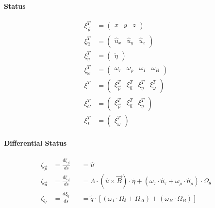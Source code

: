 \documentclass[review]{elsarticle}
\begin{document}
\paragraph{Status}
\begin{equation} \begin{alignedat}{-1}
    \xi_{\vec{p}}^{T}&=\left(\begin{array}{ccc}
        x & y & z
    \end{array}\right) \\
    \xi_{\hat{u}}^{T}&=\left(\begin{array}{ccc}
        {\hat{u}}_{x} & {\hat{u}}_{y} & {\hat{u}}_{z}
    \end{array}\right) \\
    \xi_{\tilde{\eta}}^{T}&=\left(\begin{array}{c}
        \tilde{\eta}
    \end{array}\right) \\
    \xi_{\omega}^{T}&=\left(\begin{array}{cccc}
        \omega_{\tau} & \omega_{\rho} & \omega_{I} & \omega_{B}
    \end{array}\right) \\
    \xi^{T}&=\left(\begin{array}{cccc}
        \xi_{\vec{p}}^{T} & \xi_{\hat{u}}^{T} & \xi_{\tilde{\eta}}^{T} & \xi_{\omega}^{T}
    \end{array}\right) \\
    \xi_{G}^{T}&=\left(\begin{array}{ccc}
        \xi_{\vec{p}}^{T} & \xi_{\hat{u}}^{T} & \xi_{\tilde{\eta}}^{T}
    \end{array}\right) \\
    \xi_{L}^{T}&=\left(\begin{array}{c}
        \xi_{\omega}^{T}
    \end{array}\right)
\end{alignedat} \end{equation} 

\paragraph{Differential Status}
\begin{equation} \begin{alignedat}{-1}
    \zeta_{\vec{p}}&=\frac{d\xi_{\vec{p}}}{ds}&&=\hat{u} \\
    \zeta_{\vec{u}}&=\frac{d\xi_{\vec{u}}}{ds}&&=\Lambda\cdot(\hat{u}\times\vec{B})\cdot\tilde{\eta}+(\omega_{\tau}\cdot\hat{n}_{\tau}+\omega_{\rho}\cdot\hat{n}_{\rho})\cdot\Omega_{\theta} \\
    \zeta_{\tilde{\eta}}&=\frac{d\xi_{\tilde{\eta}}}{ds}&&=\tilde{q}\cdot\left[\left(\omega_{I}\cdot\Omega_{\delta}+\Omega_{\Delta}\right)+\left(\omega_{B}\cdot\Omega_{B}\right)\right]
\end{alignedat} \end{equation} 
\end{document}
